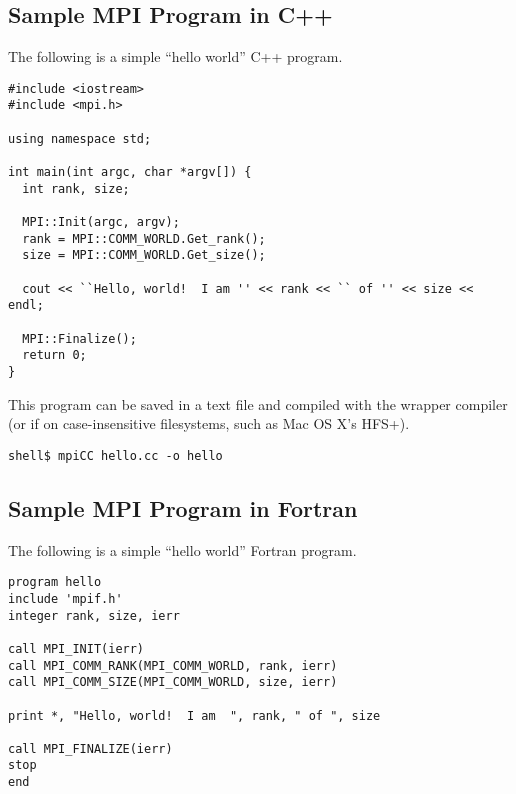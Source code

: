
\subsection{Sample MPI Program in C++}

The following is a simple ``hello world'' C++ program.

\lstset{style=lam-cxx}

\begin{lstlisting}
#include <iostream>
#include <mpi.h>

using namespace std;

int main(int argc, char *argv[]) {
  int rank, size;

  MPI::Init(argc, argv);
  rank = MPI::COMM_WORLD.Get_rank();
  size = MPI::COMM_WORLD.Get_size();

  cout << ``Hello, world!  I am '' << rank << `` of '' << size << endl;

  MPI::Finalize();
  return 0;
}
\end{lstlisting}

This program can be saved in a text file and compiled with the
 wrapper compiler (or  if on case-insensitive
filesystems, such as Mac OS X's HFS+).

\lstset{style=lam-cmdline}
\begin{lstlisting}
shell$ mpiCC hello.cc -o hello
\end{lstlisting}


\subsection{Sample MPI Program in Fortran}

The following is a simple ``hello world'' Fortran program.

\lstset{style=lam-fortran}

\begin{lstlisting}
program hello
include 'mpif.h'
integer rank, size, ierr

call MPI_INIT(ierr)
call MPI_COMM_RANK(MPI_COMM_WORLD, rank, ierr)
call MPI_COMM_SIZE(MPI_COMM_WORLD, size, ierr)

print *, "Hello, world!  I am  ", rank, " of ", size

call MPI_FINALIZE(ierr)
stop
end
\end{lstlisting}

